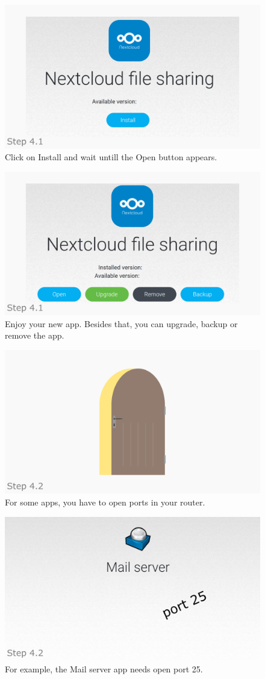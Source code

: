 \documentclass[a4paper,12pt]{article}
\begin{document}
\begin{figure}[htbp!]
	\centering
	\includegraphics[width=0.7\linewidth]{../frames/49.png}
	\caption{Click on Install and wait untill the Open button appears.}
	\label{fig:36}
\end{figure}

\begin{figure}[htbp!]
	\centering
	\includegraphics[width=0.7\linewidth]{../frames/50.png}
	\caption{Enjoy your new app. Besides that, you can upgrade, backup or remove the app.}
	\label{fig:37}
\end{figure}

\begin{figure}[htbp!]
	\centering
	\includegraphics[width=0.7\linewidth]{../frames/51.png}
	\caption{For some apps, you have to open ports in your router.}
	\label{fig:38}
\end{figure}

\begin{figure}[htbp!]
	\centering
	\includegraphics[width=0.7\linewidth]{../frames/52.png}
	\caption{For example, the Mail server app needs open port 25.}
	\label{fig:39}
\end{figure}
\end{document}
